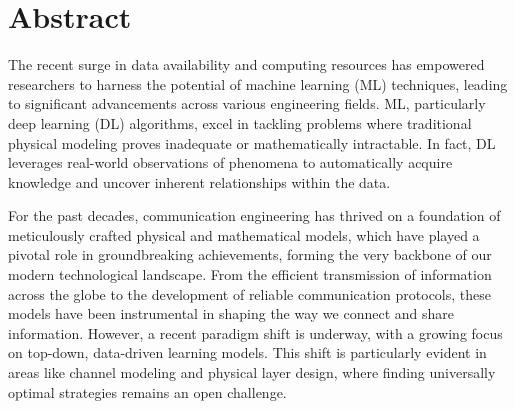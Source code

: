 \newpage

\section*{Abstract}
\label{sec:abstract}
\begin{comment}
The increased availability of data and computing resources has enabled researchers to successfully adopt machine learning (ML) techniques and make significant contributions in several engineering areas. ML and in particular deep learning (DL) algorithms have shown to perform better in tasks where a physical bottom-up description of the phenomenon is lacking and/or is mathematically intractable. Indeed, they take advantage of the observations of natural phenomena to automatically acquire knowledge and learn internal relations.
Despite the historical model-based mindset, communications engineering recently started shifting the focus towards top-down data-driven learning models, especially in domains such as channel modeling and physical layer design, where in most of the cases no general optimal strategies are known.

In this thesis, we aim at solving some fundamental open challenges in physical layer communications exploiting new DL paradigms. In particular, we mathematically formulate, under ML terms, classic problems such as channel capacity and optimal coding-decoding schemes, for any arbitrary communication medium. 
We design and develop the architecture, algorithm and code necessary to train the equivalent DL model, and finally, we  propose novel solutions to long-standing problems in the field. 
\end{comment}

The recent surge in data availability and computing resources has empowered researchers to harness the potential of machine learning (ML) techniques, leading to significant advancements across various engineering fields. ML, particularly deep learning (DL) algorithms, excel in tackling problems where traditional physical modeling proves inadequate or mathematically intractable. In fact, DL leverages real-world observations of phenomena to automatically acquire knowledge and uncover inherent relationships within the data.

For the past decades, communication engineering has thrived on a foundation of meticulously crafted physical and mathematical models, which have played a pivotal role in groundbreaking achievements, forming the very backbone of our modern technological landscape. From the efficient transmission of information across the globe to the development of reliable communication protocols, these models have been instrumental in shaping the way we connect and share information. 
However, a recent paradigm shift is underway, with a growing focus on top-down, data-driven learning models. This shift is particularly evident in areas like channel modeling and physical layer design, where finding universally optimal strategies remains an open challenge.

